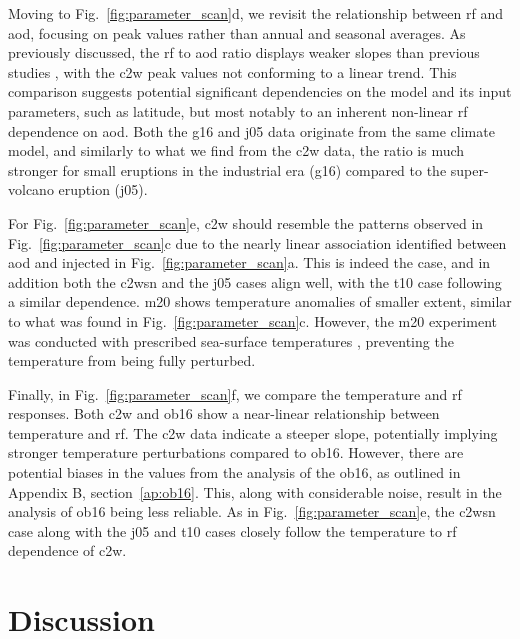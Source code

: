 \documentclass{ametsocV6.1}
\newcommand{\iso}[1][i]{{#1}njected \ce{SO2}}
\begin{document}
Moving to Fig.~\ref{fig:parameter_scan}d, we revisit the relationship between \gls{rf}
and \gls{aod}, focusing on peak values rather than annual and seasonal averages. As
previously discussed, the \gls{rf} to \gls{aod} ratio displays weaker slopes than
previous studies \citep{jones2005, marshall2020, timmreck2010}, with the \gls{c2w} peak
values not conforming to a linear trend. This comparison suggests potential significant
dependencies on the model and its input parameters, such as latitude, but most notably
to an inherent non-linear \gls{rf} dependence on \gls{aod}. Both the \gls{g16} and
\gls{j05} data originate from the same climate model, and similarly to what we find from
the \gls{c2w} data, the ratio is much stronger for small eruptions in the industrial era
(\gls{g16}) compared to the super-volcano eruption (\gls{j05}).

For Fig.~\ref{fig:parameter_scan}e, \gls{c2w} should resemble the patterns observed in
Fig.~\ref{fig:parameter_scan}c due to the nearly linear association identified between
\gls{aod} and \iso{} in Fig.~\ref{fig:parameter_scan}a. This is indeed the case, and in
addition both the \gls{c2wsn} and the \gls{j05} cases align well, with the \gls{t10}
case following a similar dependence. \gls{m20} shows temperature anomalies of smaller
extent, similar to what was found in Fig.~\ref{fig:parameter_scan}c. However, the
\gls{m20} experiment was conducted with prescribed sea-surface temperatures
\citep{marshall2020}, preventing the temperature from being fully perturbed.

Finally, in Fig.~\ref{fig:parameter_scan}f, we compare the temperature and \gls{rf}
responses. Both \gls{c2w} and \gls{ob16} show a near-linear relationship between
temperature and \gls{rf}. The \gls{c2w} data indicate a steeper slope, potentially
implying stronger temperature perturbations compared to \gls{ob16}. However, there are
potential biases in the values from the analysis of the \gls{ob16}, as outlined in
Appendix B, section~\ref{ap:ob16}. This, along with considerable noise, result in the
analysis of \gls{ob16} being less reliable. As in Fig.~\ref{fig:parameter_scan}e, the
\gls{c2wsn} case along with the \gls{j05} and \gls{t10} cases closely follow the
temperature to \gls{rf} dependence of \gls{c2w}.

\section{Discussion}\label{sec:discussion}

\end{document}

